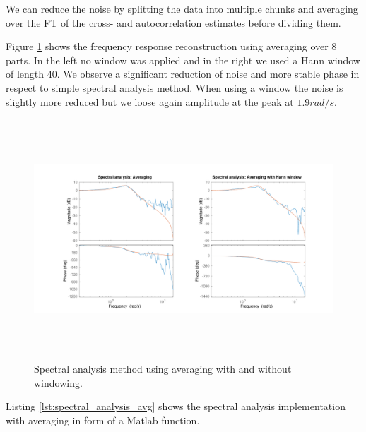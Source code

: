 \documentclass[a4paper,11pt]{article}
\begin{document}
We can reduce the noise by splitting the data into multiple chunks and averaging over the FT of the cross- and autocorrelation estimates before dividing them.

Figure \ref{fig:bode_avg} shows the frequency response reconstruction using averaging over 8 parts.
In the left no window was applied and in the right we used a Hann window of length 40.
We observe a significant reduction of noise and more stable phase in respect to simple spectral analysis method.
When using a window the noise is slightly more reduced but we loose again amplitude at the peak at $1.9rad/s$.

\begin{figure}[H]
	\centering
    \includegraphics[height=9cm]{images/ce2_2_averaging}
    \caption{Spectral analysis method using averaging with and without windowing.}
    \label{fig:bode_avg}
\end{figure}

Listing \ref{lst:spectral_analysis_avg} shows the spectral analysis implementation with averaging in form of a Matlab function.
\end{document}
